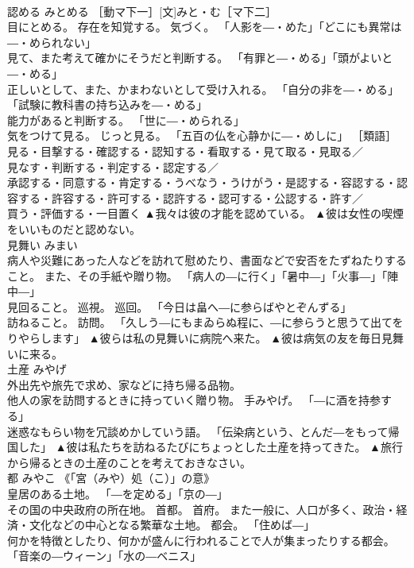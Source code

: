\documentclass[8pt]{extreport}
\begin{document}
\begin{CJK}{UTF8}{min}
\\	認める	みとめる	［動マ下一］[文]みと・む［マ下二］ 
\\	目にとめる。 存在を知覚する。 気づく。 「人影を―・めた」「どこにも異常は―・められない」 
\\	見て、また考えて確かにそうだと判断する。 「有罪と―・める」「頭がよいと―・める」 
\\	正しいとして、また、かまわないとして受け入れる。 「自分の非を―・める」「試験に教科書の持ち込みを―・める」 
\\	能力があると判断する。 「世に―・められる」 
\\	気をつけて見る。 じっと見る。 「五百の仏を心静かに―・めしに」 ［類語］
\\	見る・目撃する・確認する・認知する・看取する・見て取る・見取る／
\\	見なす・判断する・判定する・認定する／
\\	承認する・同意する・肯定する・うべなう・うけがう・是認する・容認する・認容する・許容する・許可する・認許する・認可する・公認する・許す／
\\	買う・評価する・一目置く	▲我々は彼の才能を認めている。 ▲彼は女性の喫煙をいいものだと認めない。
\\	見舞い	みまい	
\\	病人や災難にあった人などを訪れて慰めたり、書面などで安否をたずねたりすること。 また、その手紙や贈り物。 「病人の―に行く」「暑中―」「火事―」「陣中―」 
\\	見回ること。 巡視。 巡回。 「今日は畠へ―に参らばやとぞんずる」 
\\	訪ねること。 訪問。 「久しう―にもまゐらぬ程に、―に参らうと思うて出てをりやらします」	▲彼らは私の見舞いに病院へ来た。 ▲彼は病気の友を毎日見舞いに来る。
\\	土産	みやげ	
\\	外出先や旅先で求め、家などに持ち帰る品物。 
\\	他人の家を訪問するときに持っていく贈り物。 手みやげ。 「―に酒を持参する」 
\\	迷惑なもらい物を冗談めかしていう語。 「伝染病という、とんだ―をもって帰国した」	▲彼は私たちを訪ねるたびにちょっとした土産を持ってきた。 ▲旅行から帰るときの土産のことを考えておきなさい。
\\	都	みやこ	《「宮（みや）処（こ）」の意》 
\\	皇居のある土地。 「―を定める」「京の―」 
\\	その国の中央政府の所在地。 首都。 首府。 また一般に、人口が多く、政治・経済・文化などの中心となる繁華な土地。 都会。 「住めば―」 
\\	何かを特徴としたり、何かが盛んに行われることで人が集まったりする都会。 「音楽の―ウィーン」「水の―ベニス」 

\end{CJK}
\end{document}
